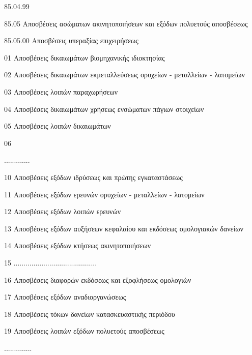 \documentclass[A4,10pt,greek]{book}
\begin{document}
                    85.04.99

        85.05    Αποσβέσεις ασώματων ακινητοποιήσεων και εξόδων
                     πολυετούς αποσβέσεως

                    85.05.00    Αποσβέσεις υπεραξίας επιχειρήσεως

                               01    Αποσβέσεις δικαιωμάτων βιομηχανικής ιδιοκτησίας

                               02    Αποσβέσεις δικαιωμάτων εκμεταλλεύσεως ορυχείων -
                                       μεταλλείων - λατομείων

                               03    Αποσβέσεις λοιπών παραχωρήσεων

                               04    Αποσβέσεις δικαιωμάτων χρήσεως ενσώματων πάγιων
                                       στοιχείων

                               05    Αποσβέσεις λοιπών δικαιωμάτων

                               06

                     .............

                               10    Αποσβέσεις εξόδων ιδρύσεως και πρώτης εγκαταστάσεως

                               11    Αποσβέσεις εξόδων ερευνών ορυχείων - μεταλλείων -
                                       λατομείων

                               12    Αποσβέσεις εξόδων λοιπών ερευνών

                               13    Αποσβέσεις εξόδων αυξήσεων κεφαλαίου και εκδόσεως
                                       ομολογιακών δανείων

                               14    Αποσβέσεις εξόδων κτήσεως ακινητοποιήσεων

                               15    ..........................................

                               16    Αποσβέσεις διαφορών εκδόσεως και εξοφλήσεως ομολογιών

                               17    Αποσβέσεις εξόδων αναδιοργανώσεως

                               18    Αποσβέσεις τόκων δανείων κατασκευαστικής περιόδου

                               19    Αποσβέσεις λοιπών εξόδων πολυετούς αποσβέσεως

                    ..............
\end{document}
